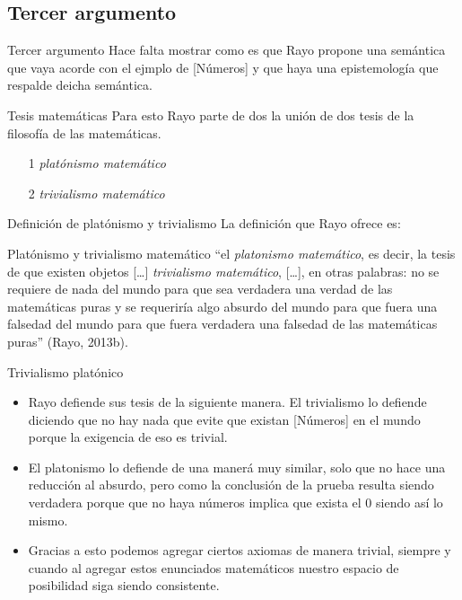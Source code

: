 \documentclass{beamer}
\begin{document}
      \subsection{Tercer argumento}
      \begin{frame}{Tercer argumento}
        Hace falta mostrar como es que Rayo propone una semántica que 
        vaya acorde con el ejmplo de [Números] y que haya una epistemología
        que respalde deicha semántica.
        \begin{block}{Tesis matemáticas}
          Para esto Rayo parte de dos la unión de dos tesis de la filosofía de 
          las matemáticas. \pause
          \begin{itemize}
            \item [1] \textit{platónismo matemático} \pause
            \item [2] \textit{trivialismo matemático}
          \end{itemize}
        \end{block}
      \end{frame}
      \begin{frame}{Definición de platónismo y trivialismo}
        La definición que Rayo ofrece es: 
        \begin{block}{Platónismo y trivialismo matemático}\pause
          \small``el \textit{platonismo matemático}, es 
          decir, la tesis de que existen objetos [\dots] \textit{trivialismo
          matemático}, [\dots], en otras palabras: no se requiere de nada del 
          mundo para que sea verdadera una verdad de las matemáticas 
          puras y se requeriría algo absurdo del mundo para que 
          fuera una falsedad del mundo para que fuera verdadera 
          una falsedad de las matemáticas puras'' (Rayo, 2013b).
        \end{block}
      \end{frame}
      \begin{frame}{Trivialismo platónico}
        \begin{itemize}
          \item Rayo defiende sus tesis de la siguiente manera. El trivialismo 
          lo defiende diciendo que no hay nada que evite que existan [Números]
          en el mundo porque la exigencia de eso es trivial.\pause

          \item El platonismo lo defiende de una manerá muy similar, solo que no 
          hace una reducción al absurdo, pero como la conclusión de la prueba 
          resulta siendo verdadera porque que no haya números implica que 
          exista el 0 siendo así lo mismo.

          \item Gracias a esto podemos agregar ciertos axiomas de manera trivial, 
          siempre y cuando al agregar estos enunciados matemáticos nuestro 
          espacio de posibilidad siga siendo consistente.  
        \end{itemize}
      \end{frame}
\end{document}

